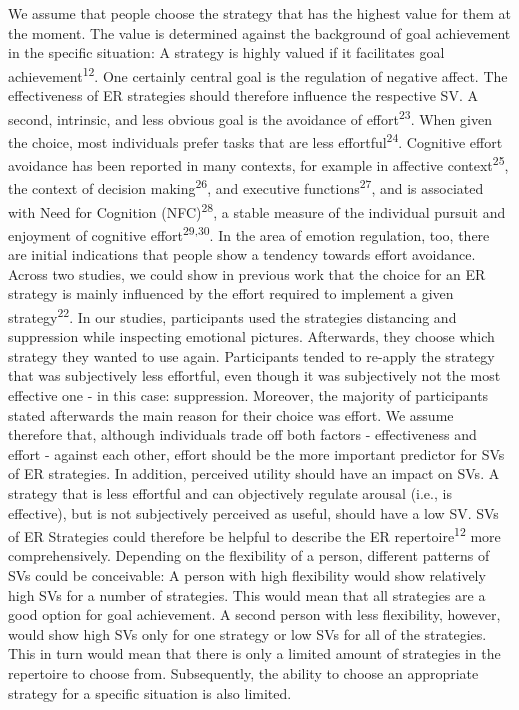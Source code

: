 \documentclass[
  english,
  man,floatsintext]{apa6}
\begin{document}
We assume that people choose the strategy that has the highest value for them at the moment.
The value is determined against the background of goal achievement in the specific situation: A strategy is highly valued if it facilitates goal achievement\textsuperscript{12}.
One certainly central goal is the regulation of negative affect.
The effectiveness of ER strategies should therefore influence the respective SV.
A second, intrinsic, and less obvious goal is the avoidance of effort\textsuperscript{23}.
When given the choice, most individuals prefer tasks that are less effortful\textsuperscript{24}.
Cognitive effort avoidance has been reported in many contexts, for example in affective context\textsuperscript{25}, the context of decision making\textsuperscript{26}, and executive functions\textsuperscript{27}, and is associated with Need for Cognition (NFC)\textsuperscript{28}, a stable measure of the individual pursuit and enjoyment of cognitive effort\textsuperscript{29,30}.
In the area of emotion regulation, too, there are initial indications that people show a tendency towards effort avoidance.
Across two studies, we could show in previous work that the choice for an ER strategy is mainly influenced by the effort required to implement a given strategy\textsuperscript{22}.
In our studies, participants used the strategies distancing and suppression while inspecting emotional pictures.
Afterwards, they choose which strategy they wanted to use again.
Participants tended to re-apply the strategy that was subjectively less effortful, even though it was subjectively not the most effective one - in this case: suppression.
Moreover, the majority of participants stated afterwards the main reason for their choice was effort.
We assume therefore that, although individuals trade off both factors - effectiveness and effort - against each other, effort should be the more important predictor for SVs of ER strategies.
In addition, perceived utility should have an impact on SVs.
A strategy that is less effortful and can objectively regulate arousal (i.e., is effective), but is not subjectively perceived as useful, should have a low SV.
SVs of ER Strategies could therefore be helpful to describe the ER repertoire\textsuperscript{12} more comprehensively.
Depending on the flexibility of a person, different patterns of SVs could be conceivable: A person with high flexibility would show relatively high SVs for a number of strategies.
This would mean that all strategies are a good option for goal achievement.
A second person with less flexibility, however, would show high SVs only for one strategy or low SVs for all of the strategies.
This in turn would mean that there is only a limited amount of strategies in the repertoire to choose from.
Subsequently, the ability to choose an appropriate strategy for a specific situation is also limited.
\end{document}
